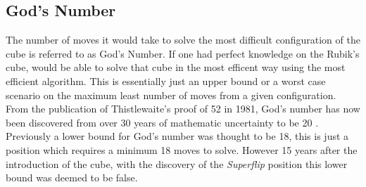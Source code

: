 \documentclass{article}
\begin{document}
\subsection{God's Number}
The number of moves it would take to solve the most difficult configuration of the cube is referred to as God's Number. If one had perfect knowledge on the Rubik's cube, would be able to solve that cube in the most efficent way using the most efficient algorithm. This is essentially just an upper bound or a worst case scenario on the maximum least number of moves from a given configuration. From the publication of Thistlewaite's proof of 52 in 1981, God's number has now been discovered from over 30 years of mathematic uncertainty to be 20 \cite{God}. \newline Previously a lower bound for God's number was thought to be 18, this is just a position which requires a minimum 18 moves to solve. However 15 years after the introduction of the cube, with the discovery of the \textit{Superflip} position this lower bound was deemed to be false.
\end{document}
